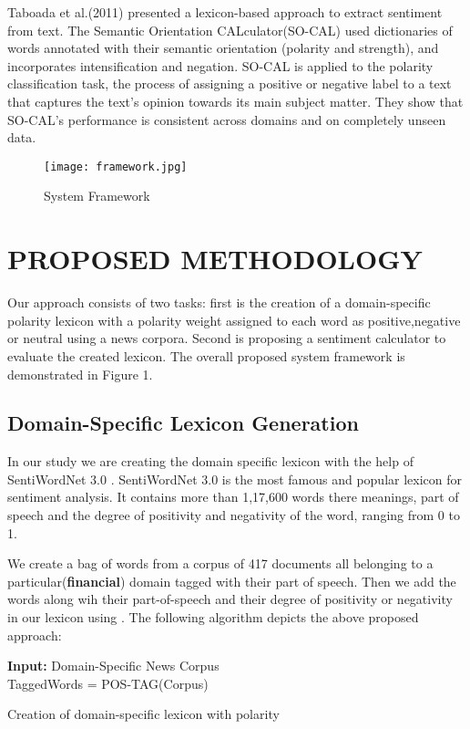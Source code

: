 \documentclass[a4paper, 10pt, conference]{ieeeconf}
\begin{document}
	Taboada et al.(2011) \cite{c7} presented a lexicon-based approach to extract sentiment from text. The Semantic Orientation
	CALculator(SO-CAL) used dictionaries of words annotated with their semantic orientation
	(polarity and strength), and incorporates intensification and negation. SO-CAL is applied to the
	polarity classification task, the process of assigning a positive or negative label to a text that
	captures the text’s opinion towards its main subject matter. They show that SO-CAL’s performance
	is consistent across domains and on completely unseen data.
	\begin{figure*}[h!]
		\centering
			\texttt{[image: framework.jpg]}
		\caption{System Framework}
		\label{fig:framework}
	\end{figure*}
	\section{PROPOSED METHODOLOGY}
	Our approach consists of two tasks: first is the creation of a domain-specific polarity lexicon with a polarity weight assigned to each word as positive,negative or neutral using a news corpora. Second is proposing a sentiment calculator to evaluate the created lexicon. The overall proposed system framework is demonstrated in Figure 1.
	
	\subsection{Domain-Specific Lexicon Generation}
	In our study we are creating the domain specific lexicon with the help of SentiWordNet 3.0 \cite{c1}. SentiWordNet 3.0 is the most famous and popular lexicon for sentiment analysis. It contains more than 1,17,600 words  there meanings, part of speech  and the degree of positivity and negativity of the word, ranging from 0 to 1.
	
	We create a bag of words from a corpus of 417 documents all belonging to a particular(\textbf{financial}) domain tagged with their part of speech. Then we add the words along wih their part-of-speech and their degree of positivity or negativity in our lexicon using \cite{c1}. The following algorithm depicts the above proposed approach:  
	\begin{algorithm}
		\SetAlgoLined
		\textbf{Input:} Domain-Specific News Corpus\\
		TaggedWords = POS-TAG(Corpus)\\
		
		\caption{Creation of domain-specific lexicon with polarity}
	\end{algorithm}
\end{document}
